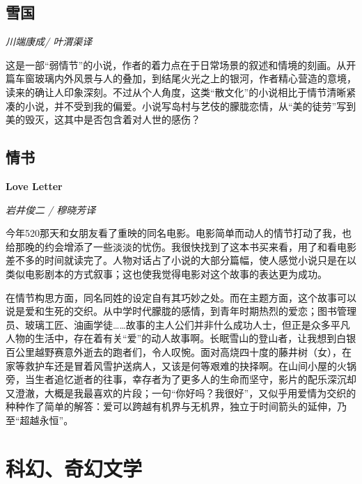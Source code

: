 \subsection*{雪国}
\par \emph{川端康成/ 叶渭渠译}
\par 这是一部“弱情节”的小说，作者的着力点在于日常场景的叙述和情境的刻画。从开篇车窗玻璃内外风景与人的叠加，到结尾火光之上的银河，作者精心营造的意境，读来的确让人印象深刻。不过从个人角度，这类“散文化”的小说相比于情节清晰紧凑的小说，并不受到我的偏爱。小说写岛村与艺伎的朦胧恋情，从“美的徒劳”写到美的毁灭，这其中是否包含着对人世的感伤？
\par {}

\subsection*{情书}
\par \textbf{Love Letter}
\par \emph{岩井俊二 /  穆晓芳译}
\par 今年520那天和女朋友看了重映的同名电影。电影简单而动人的情节打动了我，也给那晚的约会增添了一些淡淡的忧伤。我很快找到了这本书买来看，用了和看电影差不多的时间就读完了。人物对话占了小说的大部分篇幅，使人感觉小说只是在以类似电影剧本的方式叙事；这也使我觉得电影对这个故事的表达更为成功。
\par 在情节构思方面，同名同姓的设定自有其巧妙之处。而在主题方面，这个故事可以说是爱和生死的交织。从中学时代朦胧的感情，到青年时期热烈的爱恋；图书管理员、玻璃工匠、油画学徒……故事的主人公们并非什么成功人士，但正是众多平凡人物的生活中，存在着有关“爱”的动人故事啊。长眠雪山的登山者，让我想到白银百公里越野赛意外逝去的跑者们，令人叹惋。面对高烧四十度的藤井树（女），在家等救护车还是冒着风雪护送病人，又该是何等艰难的抉择啊。在山间小屋的火锅旁，当生者追忆逝者的往事，幸存者为了更多人的生命而坚守，影片的配乐深沉却又澄澈，大概是我最喜欢的片段；一句“你好吗？我很好”，又似乎用爱情为交织的种种作了简单的解答：爱可以跨越有机界与无机界，独立于时间箭头的延伸，乃至“超越永恒”。
\par {}

\section{科幻、奇幻文学}

